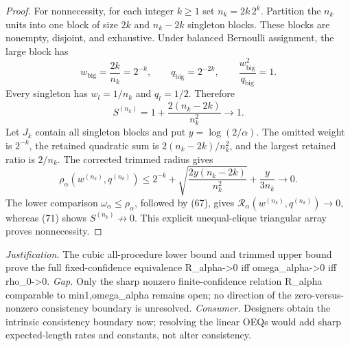 \documentclass{article}
\begin{document}
\begin{proof}
For nonnecessity, for each integer \(k\ge1\) set \(n_k=2k\,2^k\). Partition the \(n_k\) units into one block of size \(2k\) and \(n_k-2k\) singleton blocks. These blocks are nonempty, disjoint, and exhaustive. Under balanced Bernoulli assignment, the large block has
\[
 w_{\mathrm{big}}=\frac{2k}{n_k}=2^{-k},
 \qquad q_{\mathrm{big}}=2^{-2k},
 \qquad \frac{w_{\mathrm{big}}^2}{q_{\mathrm{big}}}=1.
\tag{70}
\]
Every singleton has \(w_l=1/n_k\) and \(q_l=1/2\). Therefore
\[
 S^{(n_k)}=1+\frac{2(n_k-2k)}{n_k^2}\longrightarrow1.
\tag{71}
\]
Let \(J_k\) contain all singleton blocks and put \(y=\log(2/\alpha)\). The omitted weight is \(2^{-k}\), the retained quadratic sum is \(2(n_k-2k)/n_k^2\), and the largest retained ratio is \(2/n_k\). The corrected trimmed radius gives
\[
 \rho_\alpha(w^{(n_k)},q^{(n_k)})
 \le2^{-k}+\sqrt{\frac{2y(n_k-2k)}{n_k^2}}
       +\frac{y}{3n_k}
 \longrightarrow0.
\tag{72}
\]
The lower comparison \(\omega_\alpha\le\rho_\alpha\), followed by (67), gives \(\mathcal R_\alpha(w^{(n_k)},q^{(n_k)})\to0\), whereas (71) shows \(S^{(n_k)}\not\to0\). This explicit unequal-clique triangular array proves nonnecessity.
\end{proof}
\par\smallskip\noindent \textit{Justification.} The cubic all-procedure lower bound and trimmed upper bound prove the full fixed-confidence equivalence R\_alpha->0 iff omega\_alpha->0 iff rho\_0->0. \textit{Gap.} Only the sharp nonzero finite-confidence relation R\_alpha comparable to min{1,omega\_alpha} remains open; no direction of the zero-versus-nonzero consistency boundary is unresolved. \textit{Consumer.} Designers obtain the intrinsic consistency boundary now; resolving the linear OEQs would add sharp expected-length rates and constants, not alter consistency.
\end{document}
